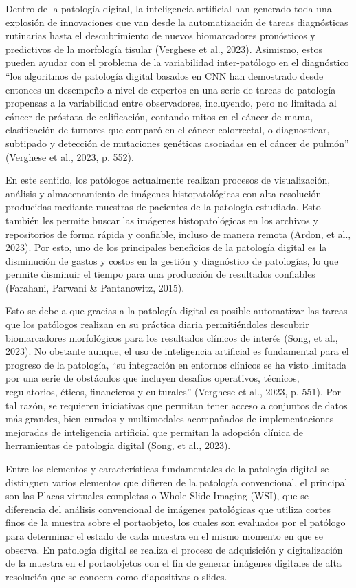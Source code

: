 \documentclass[12pt,letterpaper,final, openany]{scrbook}
\begin{document}
Dentro de la patología digital, la inteligencia artificial han generado toda una explosión de innovaciones que van desde la automatización de tareas diagnósticas rutinarias hasta el descubrimiento de nuevos biomarcadores pronósticos y predictivos de la morfología tisular (Verghese et al., 2023). Asimismo, estos pueden ayudar con el problema de la variabilidad inter-patólogo en el diagnóstico ``los algoritmos de patología digital basados en CNN han demostrado desde entonces un desempeño a nivel de expertos en una serie de tareas de patología propensas a la variabilidad entre observadores, incluyendo, pero no limitada al cáncer de próstata de calificación, contando mitos en el cáncer de mama, clasificación de tumores que comparó en el cáncer colorrectal, o diagnosticar, subtipado y detección de mutaciones genéticas asociadas en el cáncer de pulmón” (Verghese et al., 2023, p. 552).

En este sentido, los patólogos actualmente realizan procesos de visualización, análisis y almacenamiento de imágenes histopatológicas con alta resolución producidas mediante muestras de pacientes de la patología estudiada. Esto también les permite buscar las imágenes histopatológicas en los archivos y repositorios de forma rápida y confiable, incluso de manera remota (Ardon, et al., 2023). Por esto, uno de los principales beneficios de la patología digital es la disminución de gastos y costos en la gestión y diagnóstico de patologías, lo que permite disminuir el tiempo para una producción de resultados confiables (Farahani, Parwani \& Pantanowitz, 2015).

Esto se debe a que gracias a la patología digital es posible automatizar las tareas que los patólogos realizan en su práctica diaria permitiéndoles descubrir biomarcadores morfológicos para los resultados clínicos de interés (Song, et al., 2023). No obstante aunque, el uso de inteligencia artificial es fundamental para el progreso de la patología, “su integración en entornos clínicos se ha visto limitada por una serie de obstáculos que incluyen desafíos operativos, técnicos, regulatorios, éticos, financieros y culturales” (Verghese et al., 2023, p. 551). Por tal razón, se requieren iniciativas que permitan tener acceso a conjuntos de datos más grandes, bien curados y multimodales acompañados de implementaciones mejoradas de inteligencia artificial que permitan la adopción clínica de herramientas de patología digital (Song, et al., 2023).

Entre los elementos y características fundamentales de la patología digital se distinguen varios elementos que difieren de la patología convencional, el principal son las Placas virtuales completas o Whole-Slide Imaging (WSI), que se diferencia del análisis convencional de imágenes patológicas que utiliza cortes finos de la muestra sobre el portaobjeto, los cuales son evaluados por el patólogo para determinar el estado de cada muestra en el mismo momento en que se observa. En patología digital se realiza el proceso de adquisición y digitalización de la muestra en el portaobjetos con el fin de generar imágenes digitales de alta resolución que se conocen como diapositivas o slides.
\end{document}
